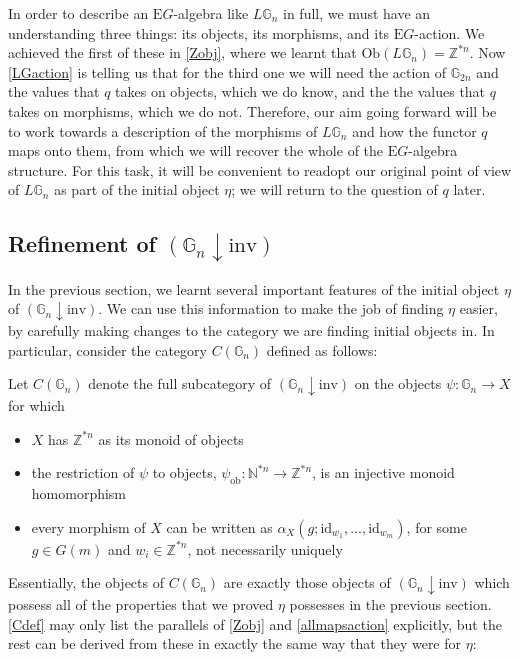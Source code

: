 In order to describe an $\mathrm{E}G$-algebra like $L\mathbb{G}_n$ in full, we must have an understanding three things: its objects, its morphisms, and its $\mathrm{E}G$-action. We achieved the first of these in \cref{Zobj}, where we learnt that $\mathrm{Ob}(L\mathbb{G}_n) = \mathbb{Z}^{\ast n}$. Now \cref{LGaction} is telling us that for the third one we will need the action of $\mathbb{G}_{2n}$ and the values that $q$ takes on objects, which we do know, and the the values that $q$ takes on morphisms, which we do not. Therefore, our aim  going forward will be to work towards a description of the morphisms of $L\mathbb{G}_n$ and how the functor $q$ maps onto them, from which we will recover the whole of the $\mathrm{E}G$-algebra structure. For this task, it will be convenient to readopt our original point of view of $L\mathbb{G}_n$ as part of the initial object $\eta$; we will return to the question of $q$ later. 

\subsection{Refinement of $(\mathbb{G}_n \downarrow \mathrm{inv})$}

In the previous section, we learnt several important features of the initial object $\eta$ of $(\mathbb{G}_n \downarrow \mathrm{inv})$. We can use this information to make the job of finding $\eta$ easier, by carefully making changes to the category we are finding initial objects in. In particular, consider the category $C(\mathbb{G}_n)$ defined as follows:

\begin{defn}\label{Cdef} Let $C(\mathbb{G}_n)$ denote the full subcategory of $(\mathbb{G}_n \downarrow \mathrm{inv})$ on the objects $\psi: \mathbb{G}_n \to X$ for which
\begin{itemize}
\item $X$ has $\mathbb{Z}^{\ast n}$ as its monoid of objects
\item the restriction of $\psi$ to objects, $\psi_{\mathrm{ob}}: \mathbb{N}^{\ast n} \to \mathbb{Z}^{\ast n}$, is an injective monoid homomorphism
\item every morphism of $X$ can be written as $\alpha_X(g; \mathrm{id}_{w_1}, ..., \mathrm{id}_{w_m})$, for some $g \in G(m)$ and $w_i \in \mathbb{Z}^{\ast n}$, not necessarily uniquely
\end{itemize}
\end{defn}

Essentially, the objects of $C(\mathbb{G}_n)$ are exactly those objects of $(\mathbb{G}_n \downarrow \mathrm{inv})$ which possess all of the properties that we proved $\eta$ possesses in the previous section. \cref{Cdef} may only list the parallels of \cref{Zobj} and \cref{allmapsaction} explicitly, but the rest can be derived from these in exactly the same way that they were for $\eta$:

